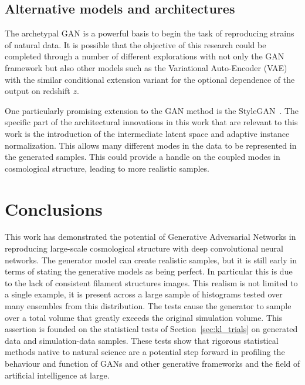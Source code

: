 \documentclass[twocolumn]{article}
\numberwithin{equation}{section}
\begin{document}
\subsection{Alternative models and architectures}

The archetypal GAN is a powerful basis to begin the task of reproducing strains of natural data. It is possible that the  objective of this research could be completed through a number of different explorations with not only the GAN framework but also other models such as the Variational Auto-Encoder (VAE)~\cite{vaes, vaes2} with the similar conditional extension \cite{cvae} variant for the optional dependence of the output on redshift $z$. 

One particularly promising extension to the GAN method is the StyleGAN~\cite{nvidia_gan}. The specific part of the architectural innovations in this work that are relevant to this work is the introduction of the intermediate latent space
and adaptive instance normalization. This allows many different modes in the data to be represented in the generated samples.
This could provide a handle on the coupled modes in cosmological structure, leading to more realistic samples. 


\section{Conclusions}\label{sec:conclusions}
This work has demonstrated the potential of Generative Adversarial Networks in reproducing large-scale cosmological 
structure with deep convolutional neural networks. The generator model can create realistic samples, but it is still 
early in terms of stating the generative models as being perfect. In particular this is due to the lack of consistent 
filament structures images.
This realism is not limited to a single example, it is present across a large sample of histograms tested over many 
ensembles from this distribution. The tests cause the generator to sample over a total volume that greatly exceeds the original
simulation volume. This assertion is founded on the statistical tests of Section~\ref{sec:kl_trials} on 
generated data and simulation-data samples. These tests show that rigorous statistical methods native to natural science 
are a potential step forward in profiling the behaviour and function of GANs and other generative frameworks and the field
of artificial intelligence at large. 
\end{document}
